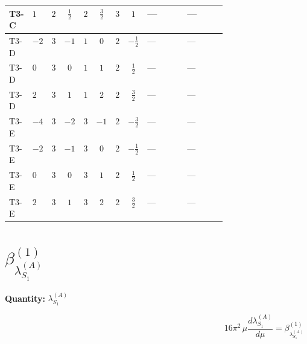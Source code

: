 \documentclass[8pt]{article}
\begin{document}
\begin{landscape}
\begin{longtable}{@{}llcccccc >{\raggedright\arraybackslash}p{0.21\linewidth} >{\raggedright\arraybackslash}p{0.21\linewidth}@{}}
\midrule
T3-C & $1$ & $2$ & $\frac{1}{2}$ & $2$ & $\frac{3}{2}$ & $3$ & $1$ & --- & --- \\
\midrule
T3-D & $-2$ & $3$ & $-1$ & $1$ & $0$ & $2$ & $-\frac{1}{2}$ & --- & --- \\
\midrule
T3-D & $0$ & $3$ & $0$ & $1$ & $1$ & $2$ & $\frac{1}{2}$ & --- & --- \\
\midrule
T3-D & $2$ & $3$ & $1$ & $1$ & $2$ & $2$ & $\frac{3}{2}$ & --- & --- \\
\midrule
T3-E & $-4$ & $3$ & $-2$ & $3$ & $-1$ & $2$ & $-\frac{3}{2}$ & --- & --- \\
\midrule
T3-E & $-2$ & $3$ & $-1$ & $3$ & $0$ & $2$ & $-\frac{1}{2}$ & --- & --- \\
\midrule
T3-E & $0$ & $3$ & $0$ & $3$ & $1$ & $2$ & $\frac{1}{2}$ & --- & --- \\
\midrule
T3-E & $2$ & $3$ & $1$ & $3$ & $2$ & $2$ & $\frac{3}{2}$ & --- & --- \\
\midrule
\bottomrule
\end{longtable}
\clearpage
\section*{$\beta_{\lambda_{S_1}^{(A)}}^{(1)}$}
\noindent\textbf{Quantity: }$\lambda_{S_1}^{(A)}$\par\smallskip
\[16\pi^2\,\mu\frac{d \lambda_{S_1}^{(A)}}{d\mu}=\beta_{\lambda_{S_1}^{(A)}}^{(1)}\]

\end{landscape}
\end{document}

